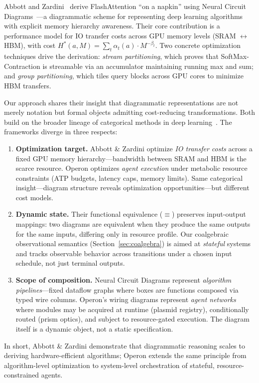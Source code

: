 Abbott and Zardini~\cite{abbott2025flashattention} derive FlashAttention
``on a napkin'' using Neural Circuit Diagrams~\cite{abbott2024neural}---a
diagrammatic scheme for representing deep learning algorithms with explicit
memory hierarchy awareness. Their core contribution is a performance model
for IO transfer costs across GPU memory levels (SRAM $\leftrightarrow$ HBM),
with cost $H^*(a, M) = \sum_t \alpha_t(a) \cdot M^{-\beta_t}$. Two
concrete optimization techniques drive the derivation: \emph{stream
partitioning}, which proves that SoftMax-Contraction is streamable via
an accumulator maintaining running max and sum; and \emph{group
partitioning}, which tiles query blocks across GPU cores to minimize
HBM transfers.

Our approach shares their insight that diagrammatic representations are
not merely notation but formal objects admitting cost-reducing
transformations. Both build on the broader lineage of categorical
methods in deep learning~\cite{fong2019seven}. The frameworks diverge
in three respects:

\begin{enumerate}[leftmargin=*]
\item \textbf{Optimization target.} Abbott \& Zardini optimize
\emph{IO transfer costs} across a fixed GPU memory hierarchy---bandwidth
between SRAM and HBM is the scarce resource. Operon optimizes
\emph{agent execution} under metabolic resource constraints (ATP budgets,
latency caps, memory limits). Same categorical insight---diagram structure
reveals optimization opportunities---but different cost models.

\item \textbf{Dynamic state.} Their functional equivalence ($\equiv$)
preserves input-output mappings: two diagrams are equivalent when they
produce the same outputs for the same inputs, differing only in resource
profile. Our coalgebraic observational semantics (Section~\ref{sec:coalgebra}) is aimed at
\emph{stateful} systems and tracks observable behavior across transitions
under a chosen input schedule, not just terminal outputs.

\item \textbf{Scope of composition.} Neural Circuit Diagrams represent
\emph{algorithm pipelines}---fixed dataflow graphs where boxes are
functions composed via typed wire columns. Operon's wiring diagrams
represent \emph{agent networks} where modules may be acquired at runtime
(plasmid registry), conditionally routed (prism optics), and subject to
resource-gated execution. The diagram itself is a dynamic object, not a
static specification.
\end{enumerate}

\noindent In short, Abbott \& Zardini demonstrate that diagrammatic
reasoning scales to deriving hardware-efficient algorithms; Operon extends
the same principle from algorithm-level optimization to system-level
orchestration of stateful, resource-constrained agents.

